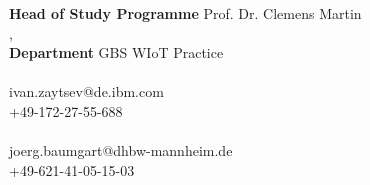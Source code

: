 \begin{titlepage}
\begin{spacing}{1.2}
\begin{tabbing}
		\textbf{Head of Study Programme}        \>  Prof. Dr. Clemens Martin\\
		\textbf{\langdbfirma}                   \>  \firma, \firmenort\\
		\textbf{Department}                     \> GBS WIoT Practice\\
		\textbf{\langdbbetreuer}                \>  \betreuer\\
                    							\>ivan.zaytsev@de.ibm.com	\\
                    							\>+49-172-27-55-688	\\
		\textbf{\langdbgutachter}               \>  \gutachter\\
                    							\>joerg.baumgart@dhbw-mannheim.de	\\
                    							\>+49-621-41-05-15-03	\\
	\end{tabbing}
	\end{spacing}
\end{titlepage}
